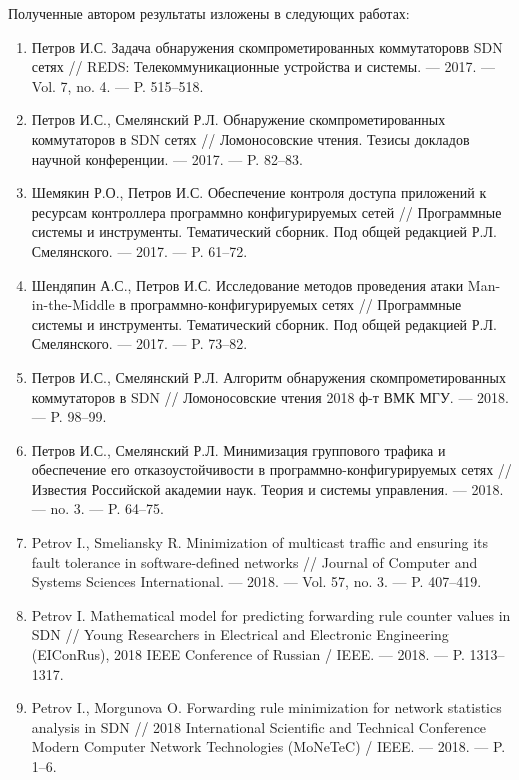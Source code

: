 \documentclass[14pt,autoref,href]{disser}
\theoremstyle{definition}
\begin{document}
\begin{spacing}{1.47}
Полученные автором результаты изложены в следующих работах:
\begin{enumerate}
\item Петров И.С. Задача обнаружения скомпрометированных коммутаторовв SDN сетях // REDS: Телекоммуникационные устройства и системы. — 2017. — Vol. 7, no. 4. — P. 515–518.

\item Петров И.С., Смелянский Р.Л. Обнаружение скомпрометированных коммутаторов в SDN сетях // Ломоносовские чтения. Тезисы докладов научной конференции. — 2017. — P. 82–83.

\item Шемякин Р.О., Петров И.С. Обеспечение контроля доступа приложений к ресурсам контроллера программно конфигурируемых сетей // Программные системы и инструменты. Тематический сборник. Под общей редакцией Р.Л. Смелянского. — 2017. — P. 61–72.

\item Шендяпин А.С., Петров И.С. Исследование методов проведения атаки Man-in-the-Middle в программно-конфигурируемых сетях // Программные системы и инструменты. Тематический сборник. Под общей редакцией Р.Л. Смелянского. — 2017. — P. 73–82.

\item Петров И.С., Смелянский Р.Л. Алгоритм обнаружения скомпрометированных коммутаторов в SDN // Ломоносовские чтения 2018 ф-т ВМК МГУ. — 2018. — P. 98–99.

\item Петров И.С., Смелянский Р.Л. Минимизация группового трафика и обеспечение его отказоустойчивости в программно-конфигурируемых сетях // Известия Российской академии наук. Теория и системы управления. — 2018. — no. 3. — P. 64–75.

\item Petrov I., Smeliansky R. Minimization of multicast traffic and ensuring its fault tolerance in software-defined networks // Journal of Computer and Systems Sciences International. — 2018. — Vol. 57, no. 3. — P. 407–419.

\item Petrov I. Mathematical model for predicting forwarding rule counter values in SDN // Young Researchers in Electrical and Electronic Engineering (EIConRus), 2018 IEEE Conference of Russian / IEEE. — 2018. — P. 1313–1317.

\item Petrov I., Morgunova O. Forwarding rule minimization for network statistics analysis in SDN // 2018  International Scientific and Technical Conference Modern Computer Network Technologies (MoNeTeC) / IEEE. — 2018. — P. 1–6.


\end{enumerate}
\end{spacing}
\end{document}
